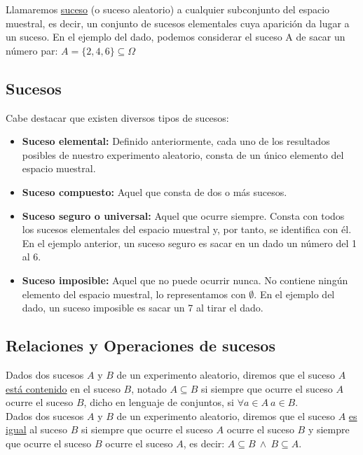 Llamaremos \underline{suceso} (o suceso aleatorio) a cualquier subconjunto del espacio muestral, es
decir, un conjunto de sucesos elementales cuya aparición da lugar a un suceso. En el ejemplo del dado,
podemos considerar el suceso A de sacar un número par: $A = \{2,4,6\} \subseteq \Omega$

\subsection{Sucesos}

Cabe destacar que existen diversos tipos de sucesos:
\begin{itemize}
  \item \textbf{Suceso elemental:} Definido anteriormente, cada uno de los resultados posibles de
        nuestro experimento aleatorio, consta de un único elemento del espacio muestral.
  \item \textbf{Suceso compuesto:} Aquel que consta de dos o más sucesos.
  \item \textbf{Suceso seguro o universal:} Aquel que ocurre siempre. Consta con todos los sucesos
        elementales del espacio muestral y, por tanto, se identifica con él. En el ejemplo anterior, un
        suceso seguro es sacar en un dado un número del 1 al 6.
  \item \textbf{Suceso imposible:} Aquel que no puede ocurrir nunca. No contiene ningún elemento
        del espacio muestral, lo representamos con $\emptyset$. En el ejemplo del dado, un suceso imposible
        es sacar un 7 al tirar el dado.
\end{itemize}

\subsection{Relaciones y Operaciones de sucesos}

Dados dos sucesos $A$ y $B$ de un experimento aleatorio, diremos que el suceso $A$ \underline{está contenido}
en el suceso $B$, notado $A \subseteq B$ si siempre que ocurre el suceso $A$ ocurre el suceso $B$, dicho en
lenguaje de conjuntos, si $\forall a \in A \ a \in B$.\\


Dados dos sucesos $A$ y $B$ de un experimento aleatorio, diremos que el suceso $A$ \underline{es igual} al
suceso $B$ si siempre que ocurre el suceso $A$ ocurre el suceso $B$ y siempre que ocurre el suceso $B$
ocurre el suceso $A$, es decir: $A \subseteq B \ \land \ B \subseteq A$.\\


